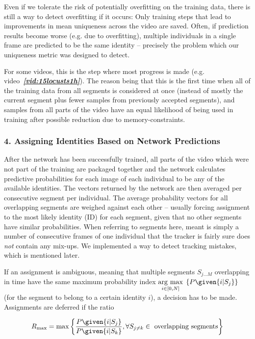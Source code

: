 \documentclass[9pt,lineno]{elife}
\newcommand{\videoref}[1]{video~\textit{\textbf{\ref{#1}}}}
\newcommand{\argmax}[1]{\underset{#1}{\operatorname{arg}\,\operatorname{max}}\;}
\begin{document}
{\color{blue} Even if we tolerate the risk of potentially overfitting on the training data, there is still a way to detect} overfitting if it occurs: {\color{blue}Only training steps that lead to improvements in mean uniqueness across the video} are saved. {\color{blue} Often, if prediction results become worse (e.g. due to overfitting), multiple individuals in a single frame are predicted to be the same identity -- precisely the problem which our uniqueness metric was designed to detect.}

{\color{blue} F}or some videos, this is the step where most progress is made (e.g. \videoref{vid:15locusts1h}). The reason being that this is the first time when all of the training data from all segments is considered at once (instead of mostly the current segment plus fewer samples from previously accepted segments), and samples from all parts of the video {\color{blue}have} an equal likelihood of being used in training after possible reduction due to memory-constraints.

\subsubsection{4. Assigning Identities Based on Network Predictions}

After the network has been successfully trained, all parts of the video which were not part of the training are packaged together and the network calculates predictive probabilities for each image of each individual to be any of the available identities. The vectors returned by the network are then averaged per consecutive segment per individual. The average probability vectors for all overlapping segments are weighed against each other -- usually forcing assignment to the most likely identity (ID) for each segment, given that no other segments have similar probabilities. When referring to segments here, meant is simply a number of consecutive frames of one individual that the tracker is fairly sure does \textit{not} contain any mix-ups. We implemented a way to detect tracking mistakes, which is mentioned later.

If an assignment is ambiguous, meaning that multiple segments $S_{j\dots M}$ overlapping in time have the same maximum probability index $\argmax{i\in[0,N]} \left\{ P\given{i|S_j} \right\}$ (for the segment to belong to a certain identity $i$), a decision has to be made. Assignments are deferred if the ratio

$$ R_\mathrm{max} = \max\left\{ 
\frac{P\given{i | S_j}}{P\given{i | S_k}}, \forall S_{j\not= k}\in \mathrm{\ overlapping\ segments} \right\} $$
\end{document}
